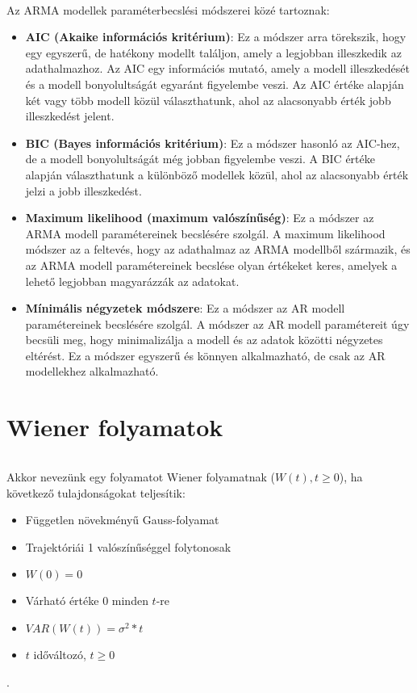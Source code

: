 \documentclass[11pt,a4paper]{article}
\begin{document}
					\paragraph{}
						Az ARMA modellek paraméterbecslési módszerei közé tartoznak:
						\begin{itemize}
							\item \textbf{AIC (Akaike információs kritérium)}: Ez a módszer arra törekszik, hogy egy egyszerű, de hatékony modellt találjon, amely a legjobban illeszkedik az adathalmazhoz. Az AIC egy információs mutató, amely a modell illeszkedését és a modell bonyolultságát egyaránt figyelembe veszi. Az AIC értéke alapján két vagy több modell közül választhatunk, ahol az alacsonyabb érték jobb illeszkedést jelent.
							\item \textbf{BIC (Bayes információs kritérium)}: Ez a módszer hasonló az AIC-hez, de a modell bonyolultságát még jobban figyelembe veszi. A BIC értéke alapján választhatunk a különböző modellek közül, ahol az alacsonyabb érték jelzi a jobb illeszkedést.
							
							\item \textbf{Maximum likelihood (maximum valószínűség)}: Ez a módszer az ARMA modell paramétereinek becslésére szolgál. A maximum likelihood módszer az a feltevés, hogy az adathalmaz az ARMA modellből származik, és az ARMA modell paramétereinek becslése olyan értékeket keres, amelyek a lehető legjobban magyarázzák az adatokat.
							
							\item \textbf{Mínimális négyzetek módszere}: Ez a módszer az AR modell paramétereinek becslésére szolgál. A módszer az AR modell paramétereit úgy becsüli meg, hogy minimalizálja a modell és az adatok közötti négyzetes eltérést. Ez a módszer egyszerű és könnyen alkalmazható, de csak az AR modellekhez alkalmazható.

					\end{itemize}
		\part{Wiener folyamatok}
			\paragraph{}
				Akkor nevezünk egy folyamatot Wiener folyamatnak ($W(t), t\ge 0$), ha következő tulajdonságokat teljesítik:
				\begin{itemize}
					\item Független növekményű Gauss-folyamat
					\item Trajektóriái 1 valószínűséggel folytonosak
					\item $W(0) = 0$
					\item Várható értéke 0 minden $t$-re
					\item $VAR(W(t)) = \sigma^2 * t$
					\item $t$ időváltozó, $t \ge 0$
				\end{itemize}.
\end{document}
